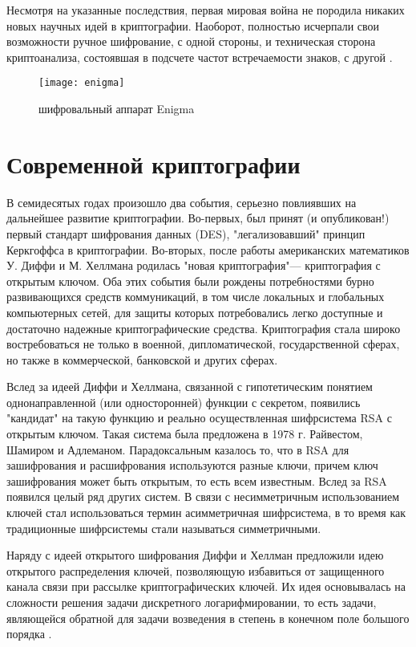 Несмотря на указанные последствия, первая мировая война не породила никаких новых научных идей в криптографии. Наоборот, полностью исчерпали свои возможности ручное шифрование, с одной стороны, и техническая сторона криптоанализа, состоявшая в подсчете частот встречаемости знаков, с другой \cite{g2005n}.

\begin{figure}[H]
	\texttt{[image: enigma]}
	\centering
	\caption{шифровальный аппарат Enigma \cite{hodges2014alan}}
\end{figure}



\section{Современной криптографии}

В семидесятых годах произошло два события, серьезно повлиявших на дальнейшее развитие криптографии. Во-первых, был принят (и опубликован!) первый стандарт шифрования данных (DES), "легализовавший" принцип Керкгоффса в криптографии. Во-вторых, после работы американ­ских математиков У. Диффи и М. Хеллмана родилась "новая криптография"— криптография с открытым клю­чом. Оба этих события были рождены потребностями бурно развивающихся средств коммуникаций, в том числе локаль­ных и глобальных компьютерных сетей, для защиты которых потребовались легко доступные и достаточно надежные крип­тографические средства. Криптография стала широко востребоваться не только в военной, дипломатической, государст­венной сферах, но также в коммерческой, банковской и дру­гих сферах.

Вслед за идеей Диффи и Хеллмана, связанной с гипотетическим понятием однонаправленной (или односторонней) функции с секретом, появились "кандидат" на такую функ­цию и реально осуществленная шифрсистема RSA с откры­тым ключом. Такая система была предложена в 1978 г. Райвестом, Шамиром и Адлеманом. Парадоксальным казалось то, что в RSA для зашифрования и расшифрования используются разные ключи, причем ключ зашифрования может быть от­крытым, то есть всем известным. Вслед за RSA появился целый ряд других систем. В связи с несимметричным исполь­зованием ключей стал использоваться термин асимметричная шифрсистема, в то время как традиционные шифрсистемы стали называться симметричными.

Наряду с идеей открытого шифрования Диффи и Хеллман предложили идею открытого распределения ключей, позво­ляющую избавиться от защищенного канала связи при рас­сылке криптографических ключей. Их идея основывалась на сложности решения задачи дискретного логарифмировании, то есть задачи, являющейся обратной для задачи возведения в степень в конечном поле большого порядка \cite{bellare2005introduction}.

